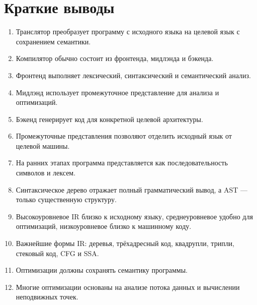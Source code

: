 \documentclass[12pt,a4paper]{article}
\begin{document}
\section{Краткие выводы}

\begin{enumerate}
    \item Транслятор преобразует программу с исходного языка на целевой язык с сохранением семантики.
    \item Компилятор обычно состоит из фронтенда, мидлэнда и бэкенда.
    \item Фронтенд выполняет лексический, синтаксический и семантический анализ.
    \item Мидлэнд использует промежуточное представление для анализа и оптимизаций.
    \item Бэкенд генерирует код для конкретной целевой архитектуры.
    \item Промежуточные представления позволяют отделить исходный язык от целевой машины.
    \item На ранних этапах программа представляется как последовательность символов и лексем.
    \item Синтаксическое дерево отражает полный грамматический вывод, а AST --- только существенную структуру.
    \item Высокоуровневое IR близко к исходному языку, среднеуровневое удобно для оптимизаций, низкоуровневое близко к машинному коду.
    \item Важнейшие формы IR: деревья, трёхадресный код, квадрупли, трипли, стековый код, CFG и SSA.
    \item Оптимизации должны сохранять семантику программы.
    \item Многие оптимизации основаны на анализе потока данных и вычислении неподвижных точек.
\end{enumerate}
\end{document}
